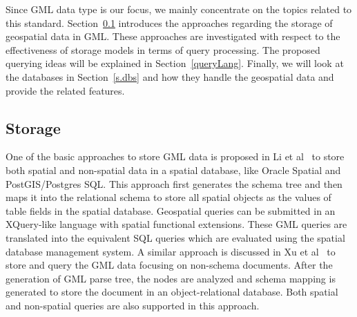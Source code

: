 \documentclass[a4paper,12pt]{article}
\begin{document}
Since GML data type is our focus, we mainly concentrate on the topics related to this standard. Section~\ref{storage} introduces the approaches regarding the storage of geospatial data in GML. 
These approaches are investigated with respect to the effectiveness of storage models in terms of query processing. The proposed querying ideas will be explained in Section~\ref{queryLang}. 
Finally, we will look at the databases in Section~\ref{s.dbs} and how they handle the geospatial data and provide the related features.
  
\subsection{Storage}
\label{storage}
One of the basic approaches to store GML data is proposed in Li et al~\cite{Li2004} to store both spatial and non-spatial data in a spatial database, like Oracle Spatial and PostGIS/Postgres SQL. This approach first generates the schema tree and then maps it into the relational schema to store all spatial objects as the values of table fields in the spatial database. Geospatial queries can be submitted 
in an XQuery-like language with spatial functional extensions. These GML queries are translated into the equivalent SQL queries which are evaluated using the spatial database management system. 
A similar approach is discussed in Xu et al~\cite{Zhu2011} to store and query the GML data focusing on non-schema documents. After the generation of GML parse tree, the nodes are analyzed and schema mapping is generated to store the document in an object-relational database. 
Both spatial and non-spatial queries are also supported in this approach.
\end{document}
